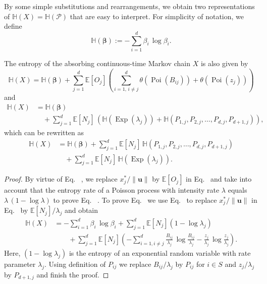 \documentclass[smallextended]{svjour3}
\makeatletter
\renewcommand*{\eqref}[1]{%
  \hyperref[{#1}]{\textup{\tagform@{\ref*{#1}}}}%
}
\renewcommand{\vec}[1]{\mathbf{#1}}
\newcommand{\E}{\mathbb{E}}
\renewcommand{\H}{\mathbb{H}}
\newcommand{\Exp}{\operatorname{Exp}}
\newcommand{\Poi}{\operatorname{Poi}}
\newcommand{\suml}{\sum\limits}
\newcommand{\vnorms}[1]{\|#1\|}
\makeatother
\begin{document}
By some simple substitutions and rearrangements, we obtain two representations of $\H(X)=\H(\mathcal{P})$ that are easy to interpret.
For simplicity of notation, we define
\begin{equation}
  \H(\vec{\beta}) := -\suml_{i=1}^d\beta_i\,\log\beta_i.
\end{equation}

\begin{myproposition}\label{prop:entropy_of_X}
	The entropy of the absorbing continuous-time Markov chain $X$ is also given by
	\begin{equation}
	  \label{eqn:H_occupation_time}
	  \H(X) = \H(\vec{\beta}) + \suml_{j=1}^d \E\left[O_j\right] \left(\suml_{i=1,\,i\neq j}^d \theta(\Poi(B_{ij})) + \theta(\Poi(z_j))\right)
	\end{equation}
	and
	\begin{equation}
	  \label{eqn:H_number_of_visits}
	  \begin{aligned}
      \H(X)& = \H(\vec{\beta})\\
      &\quad + \suml_{j=1}^d \E\left[N_j\right]\, \left(\H(\Exp(\lambda_j)) + \H(P_{1,j}, P_{2, j},\ldots,P_{d, j}, P_{d+1,j})\right),
    \end{aligned}
  \end{equation}
  which can be rewritten as
  \begin{align}
    \H(X) & = \H(\vec{\beta}) + \suml_{j=1}^d \E\left[N_j\right]\, \H(P_{1,j}, P_{2, j},\ldots,P_{d, j}, P_{d+1,j}) \label{eqn:H_discrete} \\
    &\quad + \suml_{j=1}^d \E\left[N_j\right]\, \H(\Exp(\lambda_j)).\label{eqn:H_continuous}      
  \end{align}
\end{myproposition}

\begin{proof}
  By virtue of Eq.~\eqref{eqn:H_occupation_time}, we replace $x^\ast_j/\vnorms{\vec{u}}$ by $\E\left[O_j\right]$ in Eq.~\eqref{eqn:H_X} and take into account that the entropy rate of a Poisson process with intensity rate $\lambda$ equals $\lambda\,(1-\log \lambda)$ to prove Eq.~\eqref{eqn:H_occupation_time}.
  To prove Eq.~\eqref{eqn:H_number_of_visits} we use Eq.~\eqref{eqn:N_i} to replace $x^\ast_j/\vnorms{\vec{u}}$ in Eq.~\eqref{eqn:H_X} by $\E\left[N_j\right]/\lambda_j$ and obtain
  \begin{equation}
    \begin{aligned}
      \H(X) &= -\suml_{i=1}^d\beta_i\,\log\beta_i + \suml_{j=1}^d \E\left[N_j\right](1-\log \lambda_j)\\
      &\qquad +\suml_{j=1}^d \E\left[N_j\right]\left(- \suml_{i=1,i\neq j}^d \frac{B_{ij}}{\lambda_j}\,\log \frac{B_{ij}}{\lambda_j} - \frac{z_j}{\lambda_j}\,\log \frac{z_j}{\lambda_j}\right).
    \end{aligned}
	\end{equation}
	Here, $(1-\log \lambda_j)$ is the entropy of an exponential random variable with rate parameter $\lambda_j$.
	Using definition \eqref{eqn:P_ij} of $P_{ij}$ we replace $B_{ij}/\lambda_j$ by $P_{ij}$ for $i\in S$ and $z_j/\lambda_j$ by $P_{d+1,j}$ and finish the proof.
\end{proof}
\end{document}
